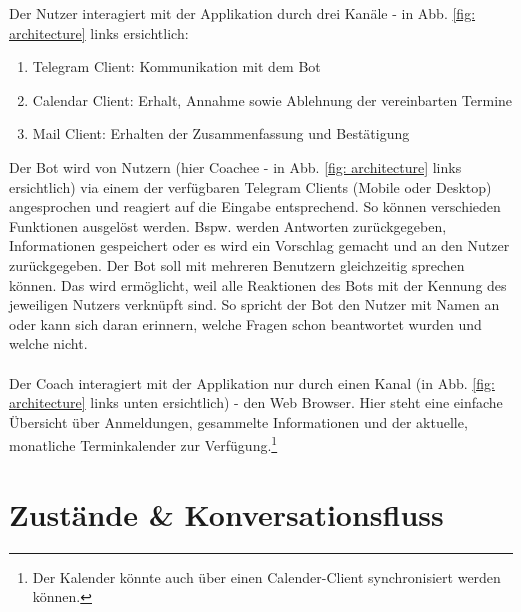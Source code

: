 	Der Nutzer interagiert mit der Applikation durch drei Kanäle - in Abb. \ref{fig: architecture} links ersichtlich:
	\begin{enumerate}
		\item Telegram Client: Kommunikation mit dem Bot
		\item Calendar Client: Erhalt, Annahme sowie Ablehnung der vereinbarten Termine
		\item Mail Client: Erhalten der Zusammenfassung und Bestätigung
	\end{enumerate}
	
	Der Bot wird von Nutzern (hier Coachee - in Abb. \ref{fig: architecture} links ersichtlich) via einem der verfügbaren Telegram Clients (Mobile oder Desktop) angesprochen und reagiert auf die Eingabe entsprechend. So können verschieden Funktionen ausgelöst werden. Bspw. werden Antworten zurückgegeben, Informationen gespeichert oder es wird ein Vorschlag gemacht und an den Nutzer zurückgegeben. Der Bot soll mit mehreren Benutzern gleichzeitig sprechen können. Das wird ermöglicht, weil alle Reaktionen des Bots mit der Kennung des jeweiligen Nutzers verknüpft sind. So spricht der Bot den Nutzer mit Namen an oder kann sich daran erinnern, welche Fragen schon beantwortet wurden und welche nicht. \\ \\
	
	Der Coach interagiert mit der Applikation nur durch einen Kanal (in Abb. \ref{fig: architecture} links unten ersichtlich) - den Web Browser. Hier steht eine einfache Übersicht über Anmeldungen, gesammelte Informationen und der aktuelle, monatliche Terminkalender zur Verfügung.\footnote{Der Kalender könnte auch über einen Calender-Client synchronisiert werden können.}

\section{Zustände \& Konversationsfluss}

